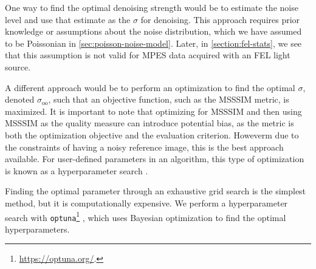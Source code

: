 
One way to find the optimal denoising strength would be to estimate the noise level and use that estimate as the $\sigma$ for denoising. This approach requires prior knowledge or assumptions about the noise distribution, which we have assumed to be Poissonian in \cref{sec:poisson-noise-model}. Later, in \cref{section:fel-stats}, we see that this assumption is not valid for \gls{MPES} data acquired with an \gls{FEL} light source.

A different approach would be to perform an optimization to find the optimal $\sigma$, denoted $\sigma_{\text{oo}}$, such that an objective function, such as the \gls{MSSSIM} metric, is maximized. It is important to note that optimizing for \gls{MSSSIM} and then using \gls{MSSSIM} as the quality measure can introduce potential bias, as the metric is both the optimization objective and the evaluation criterion. Howeverm due to the constraints of having a noisy reference image, this is the best approach available. For user-defined parameters in an algorithm, this type of optimization is known as a hyperparameter search \cite{bergstraRandomSearchHyperParameter}.

Finding the optimal parameter through an exhaustive grid search is the simplest method, but it is computationally expensive. We perform a hyperparameter search with \texttt{optuna}\footnote{\href{https://optuna.org/}{https://optuna.org/}.} \cite{akibaOptunaNextgenerationHyperparameter2019}, which uses Bayesian optimization to find the optimal hyperparameters.


